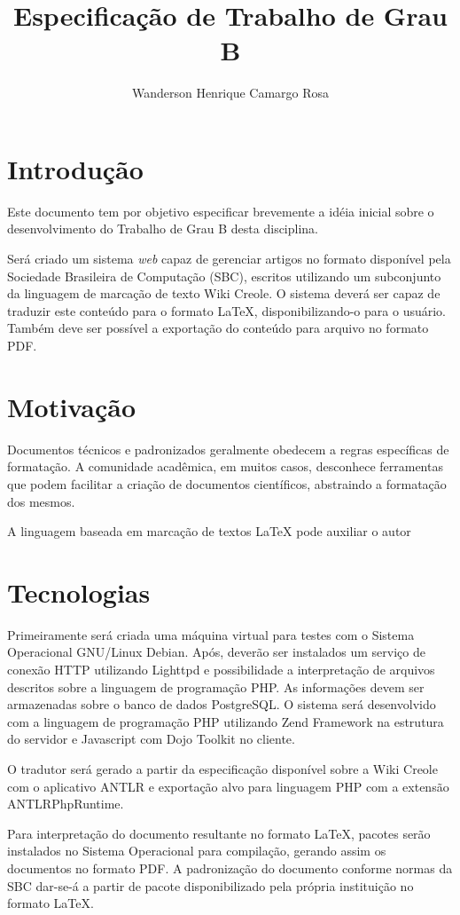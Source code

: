 \documentclass{article}
\title{Especificação de Trabalho de Grau B}
\author{Wanderson Henrique Camargo Rosa\inst{1}}
\begin{document}
\maketitle{}

\section{Introdução}
\label{sec:introducao}

Este documento tem por objetivo especificar brevemente a idéia inicial sobre o
desenvolvimento do Trabalho de Grau B desta disciplina.

Será criado um sistema \textit{web} capaz de gerenciar artigos no formato
disponível pela Sociedade Brasileira de Computação (SBC), escritos utilizando um
subconjunto da linguagem de marcação de texto Wiki Creole. O sistema deverá ser
capaz de traduzir este conteúdo para o formato LaTeX, disponibilizando-o para o
usuário. Também deve ser possível a exportação do conteúdo para arquivo no
formato PDF.

\section{Motivação}
\label{sec:motivacao}

Documentos técnicos e padronizados geralmente obedecem a regras específicas de
formatação. A comunidade acadêmica, em muitos casos, desconhece ferramentas que
podem facilitar a criação de documentos científicos, abstraindo a formatação dos
mesmos.

A linguagem baseada em marcação de textos \LaTeX{} pode auxiliar o autor 

\section{Tecnologias}
\label{sec:tecnologias}

Primeiramente será criada uma máquina virtual para testes com o Sistema
Operacional GNU/Linux Debian. Após, deverão ser instalados um serviço de conexão
HTTP utilizando Lighttpd e possibilidade a interpretação de arquivos descritos
sobre a linguagem de programação PHP. As informações devem ser armazenadas sobre
o banco de dados PostgreSQL. O sistema será desenvolvido com a linguagem de
programação PHP utilizando Zend Framework na estrutura do servidor e Javascript
com Dojo Toolkit no cliente.

O tradutor será gerado a partir da especificação disponível sobre a Wiki Creole
com o aplicativo ANTLR e exportação alvo para linguagem PHP com a extensão
ANTLRPhpRuntime.

Para interpretação do documento resultante no formato \LaTeX{}, pacotes serão
instalados no Sistema Operacional para compilação, gerando assim os documentos
no formato PDF. A padronização do documento conforme normas da SBC dar-se-á a
partir de pacote disponibilizado pela própria instituição no formato \LaTeX{}.
\end{document}

